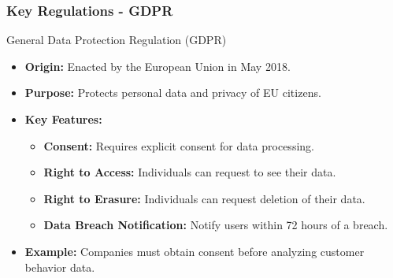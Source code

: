 \documentclass{beamer}
\begin{document}
\begin{frame}[fragile]
    \frametitle{Key Regulations - GDPR}
    
    \begin{block}{General Data Protection Regulation (GDPR)}
        \begin{itemize}
            \item \textbf{Origin:} Enacted by the European Union in May 2018.
            \item \textbf{Purpose:} Protects personal data and privacy of EU citizens.
            \item \textbf{Key Features:}
                \begin{itemize}
                    \item \textbf{Consent:} Requires explicit consent for data processing.
                    \item \textbf{Right to Access:} Individuals can request to see their data.
                    \item \textbf{Right to Erasure:} Individuals can request deletion of their data.
                    \item \textbf{Data Breach Notification:} Notify users within 72 hours of a breach.
                \end{itemize}
            \item \textbf{Example:} Companies must obtain consent before analyzing customer behavior data.
        \end{itemize}
    \end{block}
\end{frame}
\end{document}
